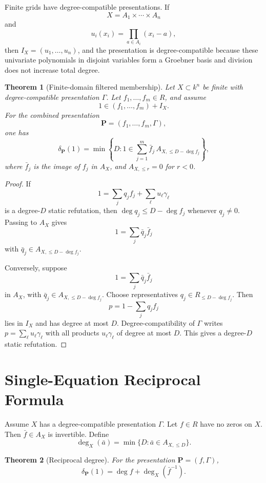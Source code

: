 \documentclass[11pt]{article}
\newtheorem{theorem}{Theorem}[section]
\begin{document}
Finite grids have degree-compatible presentations. If
\[
X=A_1\times\cdots\times A_n
\]
and
\[
u_i(x_i)=\prod_{a\in A_i}(x_i-a),
\]
then \(I_X=(u_1,\ldots,u_n)\), and the presentation is degree-compatible because these univariate polynomials in disjoint variables form a Groebner basis and division does not increase total degree.

\begin{theorem}[Finite-domain filtered membership]
Let \(X\subset k^n\) be finite with degree-compatible presentation \(\Gamma\). Let \(f_1,\ldots,f_m\in R\), and assume
\[
1\in (f_1,\ldots,f_m)+I_X.
\]
For the combined presentation
\[
\mathbf P=(f_1,\ldots,f_m,\Gamma),
\]
one has
\[
\delta_{\mathbf P}(1)
=
\min
\left\{
D:
1\in
\sum_{j=1}^m
\bar f_j\,A_{X,\le D-\deg f_j}
\right\},
\]
where \(\bar f_j\) is the image of \(f_j\) in \(A_X\), and \(A_{X,\le r}=0\) for \(r<0\).
\end{theorem}

\begin{proof}
If
\[
1=\sum_j q_j f_j+\sum_\ell u_\ell\gamma_\ell
\]
is a degree-\(D\) static refutation, then \(\deg q_j\le D-\deg f_j\) whenever \(q_j\ne0\). Passing to \(A_X\) gives
\[
1=\sum_j \bar q_j\bar f_j
\]
with \(\bar q_j\in A_{X,\le D-\deg f_j}\).

Conversely, suppose
\[
1=\sum_j \bar q_j\bar f_j
\]
in \(A_X\), with \(\bar q_j\in A_{X,\le D-\deg f_j}\). Choose representatives \(q_j\in R_{\le D-\deg f_j}\). Then
\[
p=1-\sum_j q_j f_j
\]
lies in \(I_X\) and has degree at most \(D\). Degree-compatibility of \(\Gamma\) writes \(p=\sum_\ell u_\ell\gamma_\ell\) with all products \(u_\ell\gamma_\ell\) of degree at most \(D\). This gives a degree-\(D\) static refutation.
\end{proof}

\section{Single-Equation Reciprocal Formula}

Assume \(X\) has a degree-compatible presentation \(\Gamma\). Let \(f\in R\) have no zeros on \(X\). Then \(\bar f\in A_X\) is invertible. Define
\[
\deg_X(\bar a)=\min\{D:\bar a\in A_{X,\le D}\}.
\]

\begin{theorem}[Reciprocal degree]
For the presentation \(\mathbf P=(f,\Gamma)\),
\[
\delta_{\mathbf P}(1)=\deg f+\deg_X(\bar f^{-1}).
\]
\end{theorem}
\end{document}

